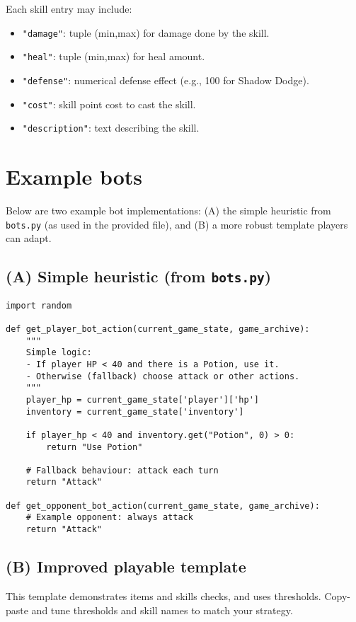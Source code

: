 \documentclass[11pt]{article}
\begin{document}
\noindent Each skill entry may include:
\begin{itemize}
  \item \texttt{"damage"}: tuple (min,max) for damage done by the skill.
  \item \texttt{"heal"}: tuple (min,max) for heal amount.
  \item \texttt{"defense"}: numerical defense effect (e.g., 100 for Shadow Dodge).
  \item \texttt{"cost"}: skill point cost to cast the skill.
  \item \texttt{"description"}: text describing the skill.
\end{itemize}

\section{Example bots}
Below are two example bot implementations: (A) the simple heuristic from \texttt{bots.py} (as used in the provided file), and (B) a more robust template players can adapt.

\subsection{(A) Simple heuristic (from \texttt{bots.py})}
\begin{lstlisting}
import random

def get_player_bot_action(current_game_state, game_archive):
    """
    Simple logic:
    - If player HP < 40 and there is a Potion, use it.
    - Otherwise (fallback) choose attack or other actions.
    """
    player_hp = current_game_state['player']['hp']
    inventory = current_game_state['inventory']

    if player_hp < 40 and inventory.get("Potion", 0) > 0:
        return "Use Potion"

    # Fallback behaviour: attack each turn
    return "Attack"

def get_opponent_bot_action(current_game_state, game_archive):
    # Example opponent: always attack
    return "Attack"
\end{lstlisting}

\subsection{(B) Improved playable template}
This template demonstrates items and skills checks, and uses thresholds. Copy-paste and tune thresholds and skill names to match your strategy.
\end{document}
